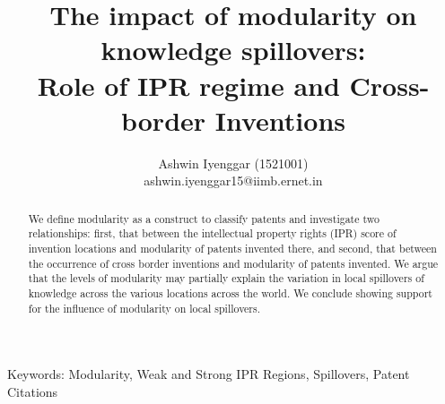 \documentclass[12pt]{article}
\begin{document}
\title{\LARGE The impact of modularity on knowledge spillovers:\\ \Large Role of IPR regime and Cross-border Inventions}
\author{Ashwin Iyenggar  (1521001) \\ ashwin.iyenggar15@iimb.ernet.in} 
\large

\maketitle
\thispagestyle{empty}

\begin{abstract}
\large We define modularity as a construct to classify patents and investigate two relationships: first, that between the intellectual property rights (IPR) score of invention locations and modularity of patents invented there, and second, that between the occurrence of cross border inventions and modularity of patents invented. We argue that the levels of modularity may partially explain the variation in local spillovers of knowledge across the various locations across the world. We conclude showing support for the influence of modularity on local spillovers.
\end{abstract}
{Keywords:} Modularity, Weak and Strong IPR Regions, Spillovers, Patent Citations
\end{document}
